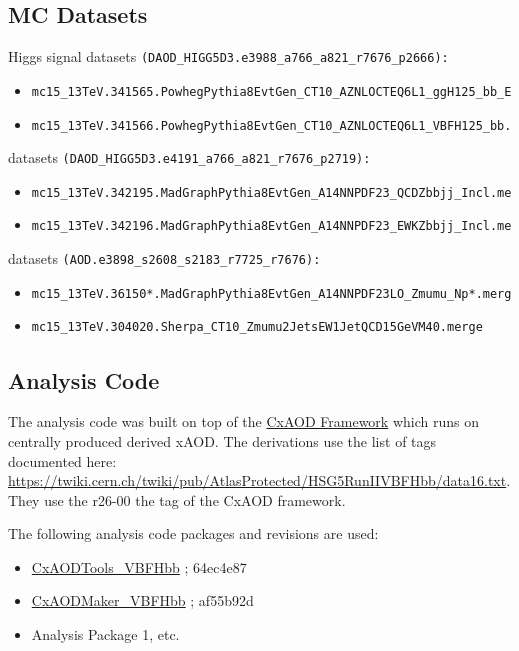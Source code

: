 \subsection{MC Datasets}
Higgs signal datasets  \texttt{(DAOD\_HIGG5D3.e3988\_a766\_a821\_r7676\_p2666):}
\begin{itemize}
\item  \begin{verbatim}
mc15_13TeV.341565.PowhegPythia8EvtGen_CT10_AZNLOCTEQ6L1_ggH125_bb_EF4jets.merge\end{verbatim}
\item  \begin{verbatim}
mc15_13TeV.341566.PowhegPythia8EvtGen_CT10_AZNLOCTEQ6L1_VBFH125_bb.merge\end{verbatim}
\end{itemize}
\zjets{} datasets \texttt{(DAOD\_HIGG5D3.e4191\_a766\_a821\_r7676\_p2719):}
\begin{itemize}
\item  \begin{verbatim}
mc15_13TeV.342195.MadGraphPythia8EvtGen_A14NNPDF23_QCDZbbjj_Incl.merge\end{verbatim}
\item  \begin{verbatim}
mc15_13TeV.342196.MadGraphPythia8EvtGen_A14NNPDF23_EWKZbbjj_Incl.merge\end{verbatim}
\end{itemize}
\zmujets{} datasets \texttt{(AOD.e3898\_s2608\_s2183\_r7725\_r7676):}
\begin{itemize}
\item  \begin{verbatim}
mc15_13TeV.36150*.MadGraphPythia8EvtGen_A14NNPDF23LO_Zmumu_Np*.merge\end{verbatim}
\item \begin{verbatim}
mc15_13TeV.304020.Sherpa_CT10_Zmumu2JetsEW1JetQCD15GeVM40.merge
\end{verbatim}
\end{itemize}


\subsection{Analysis Code}
The analysis code was built on top of the \href{https://gitlab.cern.ch/CxAODFramework}{CxAOD Framework} which runs on centrally produced derived xAOD. The \twocentral derivations use the  list of tags documented here: \url{https://twiki.cern.ch/twiki/pub/AtlasProtected/HSG5RunIIVBFHbb/data16.txt}.  They use the r26-00 the tag of the CxAOD framework.

The following analysis code packages and revisions are used:
\begin{itemize}
\item \href{https://gitlab.cern.ch/CxAODFramework/CxAODTools_VBFHbb}{CxAODTools\_VBFHbb} ; 64ec4e87
\item \href{https://gitlab.cern.ch/CxAODFramework/CxAODMaker_VBFHbb}{CxAODMaker\_VBFHbb} ; af55b92d
\item Analysis Package 1, etc.
\end{itemize}